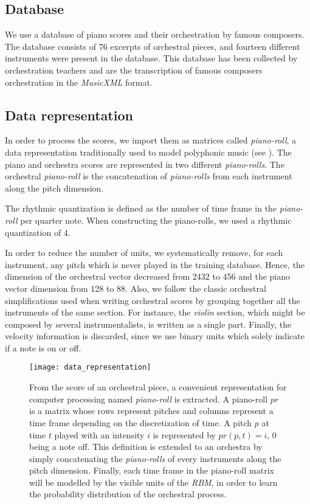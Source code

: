 \documentclass[letterpaper]{article}
\begin{document}
\subsection{Database}
We use a database of piano scores and their orchestration by famous composers. The database consists of 76 excerpts of orchestral pieces, and fourteen different instruments were present in the database. This database has been collected by orchestration teachers and are the transcription of famous composers orchestration in the \textit{MusicXML} format.

\subsection{Data representation}
In order to process the scores, we import them as matrices called \textit{piano-roll}, a data representation traditionally used to model polyphonic music (see ). The piano and orchestra scores are represented in two different \textit{piano-rolls}. The orchestral \textit{piano-roll} is the concatenation of \textit{piano-rolls} from each instrument along the pitch dimension.

The rhythmic quantization is defined as the number of time frame in the \textit{piano-roll} per quarter note. When constructing the piano-rolls, we used a rhythmic quantization of 4.

In order to reduce the number of units, we systematically remove, for each instrument, any pitch which is never played in the training database. Hence, the dimension of the orchestral vector decreased from 2432 to 456 and the piano vector dimension from 128 to 88.
Also, we follow the classic orchestral simplifications used when writing orchestral scores by grouping together all the instruments of the same section. For instance, the \textit{violin} section, which might be composed by several instrumentalists, is written as a single part.
Finally, the velocity information is discarded, since we use binary units which solely indicate if a note is on or off.

\begin{figure}[ht]
\centering
\texttt{[image: data\_representation]}
\caption{From the score of an orchestral piece, a convenient representation for computer processing named \textit{piano-roll} is extracted. A piano-roll $pr$ is a matrix whose rows represent pitches and columns represent a time frame depending on the discretization of time. A pitch $p$ at time $t$ played with an intensity $i$ is represented by $pr(p,t) = i$, $0$ being a note off. This definition is extended to an orchestra by simply concatenating the \textit{piano-rolls} of every instruments along the pitch dimension.
Finally, each time frame in the piano-roll matrix will be modelled by the visible units of the \textit{RBM}, in order to learn the probability distribution of the orchestral process.}
\label{fig:piano-roll}
\end{figure}
\end{document}
